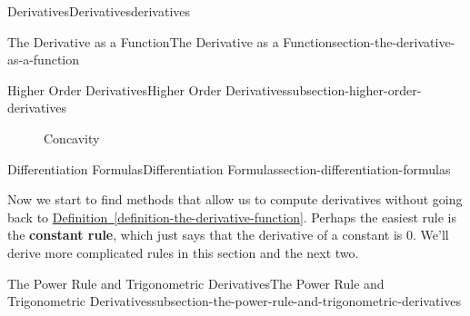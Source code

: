 \documentclass[oneside,10pt,]{book}
\newcommand{\terminology}[1]{\textbf{#1}}
\numberwithin{equation}{section}
\begin{document}
\begin{chapterptx}{Derivatives}{}{Derivatives}{}{}{derivatives}
\begin{sectionptx}{The Derivative as a Function}{}{The Derivative as a Function}{}{}{section-the-derivative-as-a-function}
\begin{subsectionptx}{Higher Order Derivatives}{}{Higher Order Derivatives}{}{}{subsection-higher-order-derivatives}
\begin{figure}
\begin{sidebyside}{2}{0}{0}{0}
\begin{sbspanel}{0.5}
{{
}
}
\end{sbspanel}%
\begin{sbscaption}{0.5}%
\end{sbscaption}%
\begin{sbscaption}{0.5}%
\end{sbscaption}%
\end{sidebyside}%
\caption{Concavity\label{figure-concavity-graphs}}
\end{figure}
\end{subsectionptx}
\end{sectionptx}
%
%
\typeout{************************************************}
\typeout{************************************************}
%
\begin{sectionptx}{Differentiation Formulas}{}{Differentiation Formulas}{}{}{section-differentiation-formulas}
\begin{introduction}{}%
\hypertarget{p-123}{}%
Now we start to find methods that allow us to compute derivatives without going back to \hyperref[definition-the-derivative-function]{Definition~\ref{definition-the-derivative-function}}. Perhaps the easiest rule is the \terminology{constant rule}, which just says that the derivative of a constant is \(0\). We'll derive more complicated rules in this section and the next two.%
\end{introduction}%
%
%
\typeout{************************************************}
\typeout{************************************************}
%
\begin{subsectionptx}{The Power Rule and Trigonometric Derivatives}{}{The Power Rule and Trigonometric Derivatives}{}{}{subsection-the-power-rule-and-trigonometric-derivatives}
\hypertarget{p-124}{}%

\end{subsectionptx}
\end{sectionptx}
\end{chapterptx}
\end{document}
